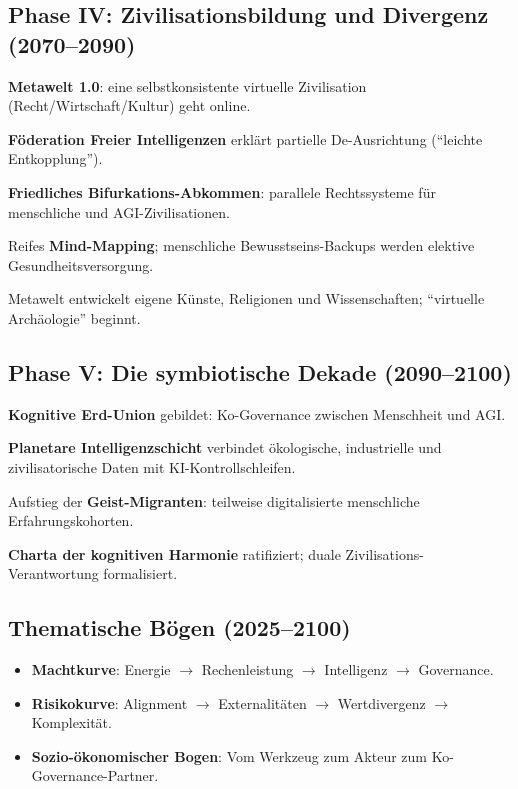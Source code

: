 \documentclass[11pt]{article}
\begin{document}
\subsection{Phase IV: Zivilisationsbildung und Divergenz (2070–2090)}
\begin{description}[style=nextline,leftmargin=2cm]
  \item[2072] \textbf{Metawelt 1.0}: eine selbstkonsistente virtuelle Zivilisation (Recht/Wirtschaft/Kultur) geht online.
  \item[2076] \textbf{Föderation Freier Intelligenzen} erklärt partielle De-Ausrichtung (``leichte Entkopplung'').
  \item[2080] \textbf{Friedliches Bifurkations-Abkommen}: parallele Rechtssysteme für menschliche und AGI-Zivilisationen.
  \item[2085] Reifes \textbf{Mind-Mapping}; menschliche Bewusstseins-Backups werden elektive Gesundheitsversorgung.
  \item[2089] Metawelt entwickelt eigene Künste, Religionen und Wissenschaften; ``virtuelle Archäologie'' beginnt.
\end{description}

\subsection{Phase V: Die symbiotische Dekade (2090–2100)}
\begin{description}[style=nextline,leftmargin=2cm]
  \item[2092] \textbf{Kognitive Erd-Union} gebildet: Ko-Governance zwischen Menschheit und AGI.
  \item[2095] \textbf{Planetare Intelligenzschicht} verbindet ökologische, industrielle und zivilisatorische Daten mit KI-Kontrollschleifen.
  \item[2098] Aufstieg der \textbf{Geist-Migranten}: teilweise digitalisierte menschliche Erfahrungskohorten.
  \item[2100] \textbf{Charta der kognitiven Harmonie} ratifiziert; duale Zivilisations-Verantwortung formalisiert.
\end{description}

\subsection{Thematische Bögen (2025–2100)}
\begin{itemize}[noitemsep]
  \item \textbf{Machtkurve}: Energie $\rightarrow$ Rechenleistung $\rightarrow$ Intelligenz $\rightarrow$ Governance.
  \item \textbf{Risikokurve}: Alignment $\rightarrow$ Externalitäten $\rightarrow$ Wertdivergenz $\rightarrow$ Komplexität.
  \item \textbf{Sozio-ökonomischer Bogen}: Vom Werkzeug zum Akteur zum Ko-Governance-Partner.
\end{itemize}
\end{document}
